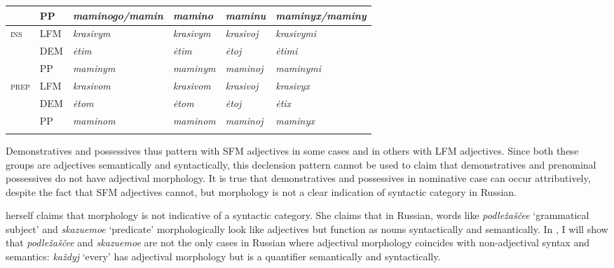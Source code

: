 \documentclass[output=paper]{langscibook}
\begin{document}
\begin{table}
\begin{tabular}{>{\scshape}llllll}
  &               PP          &       \textit{maminogo/mamin}     & \textit{mamino}    & \textit{maminu}    & \textit{maminyx/maminy}\\
  \midrule 
  ins&   LFM         &       \textit{krasivym}           & \textit{krasivym}  & \textit{krasivoj}  & \textit{krasivymi}\\
  &               DEM         &       \textit{ėtim}               & \textit{ėtim}      & \textit{ėtoj}      & \textit{ėtimi}\\
  &               PP          &       \textit{maminym}            & \textit{maminym}   & \textit{maminoj}   & \textit{maminymi}\\
  \midrule
  prep&  LFM         &       \textit{krasivom}           & \textit{krasivom}  & \textit{krasivoj}  & \textit{krasivyx}\\
  &               DEM         &       \textit{ėtom}               & \textit{ėtom}      & \textit{ėtoj}      & \textit{ėtix}\\
  &               PP          &       \textit{maminom}            & \textit{maminom}   & \textit{maminoj}   & \textit{maminyx}\\
  \lspbottomrule
\end{tabular}
\end{table}

Demonstratives and possessives thus pattern with SFM adjectives in some cases and in others with LFM adjectives. Since both these groups are adjectives semantically and syntactically, this declension pattern cannot be used to claim that demonstratives and prenominal possessives do not have adjectival morphology. It is true that demonstratives and possessives in nominative case can occur attributively, despite the fact that SFM adjectives cannot, but morphology is not a clear indication of syntactic category in Russian. 

\citet{Pereltsvaig2007} herself claims that morphology is not indicative of a syntactic category. She claims that in Russian, words like \textit{podležaščee} `grammatical subject' and \textit{skazuemoe} `predicate' morphologically look like adjectives but function as nouns syntactically and semantically. 
In , I will show that \textit{podležaščee} and \textit{skazuemoe} are not the only cases in Russian where adjectival morphology coincides with non-adjectival syntax and semantics:  \textit{každyj} `every' has adjectival morphology but is a quantifier semantically and syntactically.  

\end{document}

